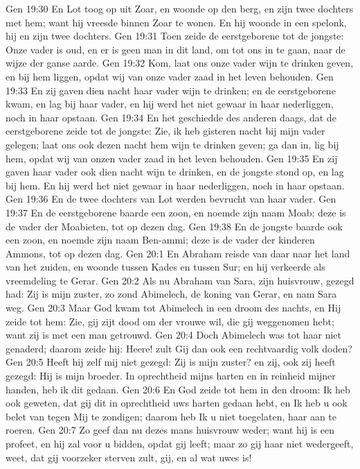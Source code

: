 Gen 19:30  En Lot toog op uit Zoar, en woonde op den berg, en zijn twee dochters met hem; want hij vreesde binnen Zoar te wonen. En hij woonde in een spelonk, hij en zijn twee dochters.
Gen 19:31  Toen zeide de eerstgeborene tot de jongste: Onze vader is oud, en er is geen man in dit land, om tot ons in te gaan, naar de wijze der ganse aarde.
Gen 19:32  Kom, laat ons onze vader wijn te drinken geven, en bij hem liggen, opdat wij van onze vader zaad in het leven behouden.
Gen 19:33  En zij gaven dien nacht haar vader wijn te drinken; en de eerstgeborene kwam, en lag bij haar vader, en hij werd het niet gewaar in haar nederliggen, noch in haar opstaan.
Gen 19:34  En het geschiedde des anderen daags, dat de eerstgeborene zeide tot de jongste: Zie, ik heb gisteren nacht bij mijn vader gelegen; laat ons ook dezen nacht hem wijn te drinken geven; ga dan in, lig bij hem, opdat wij van onzen vader zaad in het leven behouden.
Gen 19:35  En zij gaven haar vader ook dien nacht wijn te drinken, en de jongste stond op, en lag bij hem. En hij werd het niet gewaar in haar nederliggen, noch in haar opstaan.
Gen 19:36  En de twee dochters van Lot werden bevrucht van haar vader.
Gen 19:37  En de eerstgeborene baarde een zoon, en noemde zijn naam Moab; deze is de vader der Moabieten, tot op dezen dag.
Gen 19:38  En de jongste baarde ook een zoon, en noemde zijn naam Ben-ammi; deze is de vader der kinderen Ammons, tot op dezen dag.
Gen 20:1  En Abraham reisde van daar naar het land van het zuiden, en woonde tussen Kades en tussen Sur; en hij verkeerde als vreemdeling te Gerar.
Gen 20:2  Als nu Abraham van Sara, zijn huisvrouw, gezegd had: Zij is mijn zuster, zo zond Abimelech, de koning van Gerar, en nam Sara weg.
Gen 20:3  Maar God kwam tot Abimelech in een droom des nachts, en Hij zeide tot hem: Zie, gij zijt dood om der vrouwe wil, die gij weggenomen hebt; want zij is met een man getrouwd.
Gen 20:4  Doch Abimelech was tot haar niet genaderd; daarom zeide hij: Heere! zult Gij dan ook een rechtvaardig volk doden?
Gen 20:5  Heeft hij zelf mij niet gezegd: Zij is mijn zuster? en zij, ook zij heeft gezegd: Hij is mijn broeder. In oprechtheid mijns harten en in reinheid mijner handen, heb ik dit gedaan.
Gen 20:6  En God zeide tot hem in den droom: Ik heb ook geweten, dat gij dit in oprechtheid uws harten gedaan hebt, en Ik heb u ook belet van tegen Mij te zondigen; daarom heb Ik u niet toegelaten, haar aan te roeren.
Gen 20:7  Zo geef dan nu dezes mans huisvrouw weder; want hij is een profeet, en hij zal voor u bidden, opdat gij leeft; maar zo gij haar niet wedergeeft, weet, dat gij voorzeker sterven zult, gij, en al wat uwes is!
